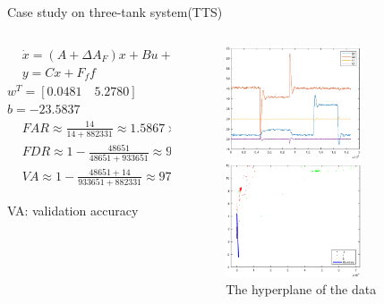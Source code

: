 \documentclass[10pt]{beamer}
\begin{document}
\begin{frame}{Case study on three-tank system(TTS)}
\begin{columns}
         \begin{column}{0.5\textwidth}
         \begin{equation}
         \begin{aligned}
     &\dot{x}=(A+\Delta A_F)x + Bu + E_ff  \\
     &y = Cx+F_ff
     \end{aligned}
 \end{equation}    
        $w^T = [0.0481 \quad 5.2780]$ $b = -23.5837$
    \begin{equation} \nonumber
  \begin{aligned}
   & FAR \approx \frac{14}{14+882331} \approx 1.5867\times 10^{-3} \% \\
   & FDR \approx 1 - \frac{48651}{48651+933651} \approx 95.05 \% \\
   & VA \approx 1 - \frac{48651+14}{933651+882331} \approx 97.32 \%
  \end{aligned}
\end{equation}
   \par
   VA: validation accuracy
           \end{column}
        \begin{column}{0.5\textwidth}  %
   \begin{figure}
        \centering
        \includegraphics[width=4cm]{fig/realori.eps}
        \caption{real data from TTS}
        \includegraphics[width=4cm]{fig/realdata.eps}
        \caption{The hyperplane of the data}
        \end{figure}
  
        \end{column}
    \end{columns}
\end{frame}
\end{document}
